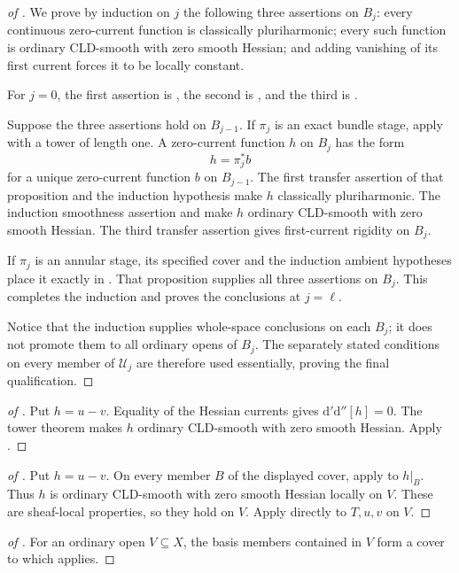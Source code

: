 \begin{proof}[of
]
We prove by induction on $j$ the following three assertions on $B_j$:
every continuous zero-current function is classically pluriharmonic; every
such function is ordinary CLD-smooth with zero smooth Hessian; and adding
vanishing of its first current forces it to be locally constant.

For $j=0$, the first assertion is
, the second is
, and the third is
.

Suppose the three assertions hold on $B_{j-1}$.  If $\pi_j$ is an exact
bundle stage, apply
 with a tower of length
one.  A zero-current function $h$ on $B_j$ has the form
\[
                              h=\pi_j^*b
\]
for a unique zero-current function $b$ on $B_{j-1}$.  The first transfer
assertion of that proposition and the induction hypothesis make $h$
classically pluriharmonic.  The induction smoothness assertion and
 make $h$ ordinary CLD-smooth with zero smooth
Hessian.  The third transfer assertion gives first-current rigidity on
$B_j$.

If $\pi_j$ is an annular stage, its specified cover and the induction
ambient hypotheses place it exactly in
.  That
proposition supplies all three assertions on $B_j$.  This completes the
induction and proves the conclusions at $j=\ell$.

Notice that the induction supplies whole-space conclusions on each $B_j$;
it does not promote them to all ordinary opens of $B_j$.  The separately
stated conditions on every member of $\mathcal U_j$ are therefore used
essentially, proving the final qualification.
\end{proof}

\begin{proof}[of
]
Put $h=u-v$.  Equality of the Hessian currents gives
$\mathrm d'\mathrm d''[h]=0$.  The tower theorem makes $h$ ordinary
CLD-smooth with zero smooth Hessian.  Apply .
\end{proof}

\begin{proof}[of
]
Put $h=u-v$.  On every member $B$ of the displayed cover, apply
 to $h|_B$.
Thus $h$ is ordinary CLD-smooth with zero smooth Hessian locally on $V$.
These are sheaf-local properties, so they hold on $V$.  Apply
 directly to $T,u,v$ on $V$.
\end{proof}

\begin{proof}[of
]
For an ordinary open $V\subseteq X$, the basis members contained in $V$
form a cover to which
applies.
\end{proof}
